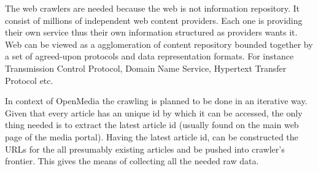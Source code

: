 The web crawlers are needed because the web is not information repository. It consist of millions of independent web content providers. Each one is providing their own service thus their own information structured as providers wants it. Web can be viewed as a agglomeration of content repository bounded together by a set of agreed-upon protocols and data representation formats. For instance Transmission Control Protocol, Domain Name Service, Hypertext Transfer Protocol etc.

In context of OpenMedia the crawling is planned to be done in an iterative way. Given that every article has an unique id by which it can be accessed, the only thing needed is to extract the latest article id (usually found on the main web page of the media portal). Having the latest article id, can be constructed the URLs for the all presumably existing articles and be pushed into crawler's frontier. This gives the means of collecting all the needed raw data.
\clearpage